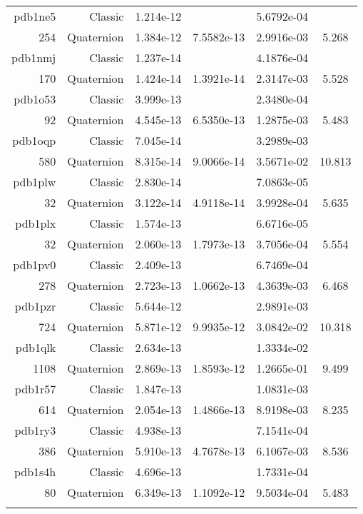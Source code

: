 \begin{xltabular}{\textwidth}{r|rS[table-format=1.3e+2]S[table-format=1.4e+2]S[table-format=1.4e+2]S[table-format=-1.3]}
pdb1ne5 & Classic & 1.214e-12 &  & 5.6792e-04 & \\
254 & Quaternion & 1.384e-12 & 7.5582e-13 & 2.9916e-03 & 5.268\\  \addlinespace
pdb1nmj & Classic & 1.237e-14 &  & 4.1876e-04 & \\
170 & Quaternion & 1.424e-14 & 1.3921e-14 & 2.3147e-03 & 5.528\\  \addlinespace
pdb1o53 & Classic & 3.999e-13 &  & 2.3480e-04 & \\
92 & Quaternion & 4.545e-13 & 6.5350e-13 & 1.2875e-03 & 5.483\\  \addlinespace
pdb1oqp & Classic & 7.045e-14 &  & 3.2989e-03 & \\
580 & Quaternion & 8.315e-14 & 9.0066e-14 & 3.5671e-02 & 10.813\\  \addlinespace
pdb1plw & Classic & 2.830e-14 &  & 7.0863e-05 & \\
32 & Quaternion & 3.122e-14 & 4.9118e-14 & 3.9928e-04 & 5.635\\  \addlinespace
pdb1plx & Classic & 1.574e-13 &  & 6.6716e-05 & \\
32 & Quaternion & 2.060e-13 & 1.7973e-13 & 3.7056e-04 & 5.554\\  \addlinespace
pdb1pv0 & Classic & 2.409e-13 &  & 6.7469e-04 & \\
278 & Quaternion & 2.723e-13 & 1.0662e-13 & 4.3639e-03 & 6.468\\  \addlinespace
pdb1pzr & Classic & 5.644e-12 &  & 2.9891e-03 & \\
724 & Quaternion & 5.871e-12 & 9.9935e-12 & 3.0842e-02 & 10.318\\  \addlinespace
pdb1qlk & Classic & 2.634e-13 &  & 1.3334e-02 & \\
1108 & Quaternion & 2.869e-13 & 1.8593e-12 & 1.2665e-01 & 9.499\\  \addlinespace
pdb1r57 & Classic & 1.847e-13 &  & 1.0831e-03 & \\
614 & Quaternion & 2.054e-13 & 1.4866e-13 & 8.9198e-03 & 8.235\\  \addlinespace
pdb1ry3 & Classic & 4.938e-13 &  & 7.1541e-04 & \\
386 & Quaternion & 5.910e-13 & 4.7678e-13 & 6.1067e-03 & 8.536\\  \addlinespace
pdb1s4h & Classic & 4.696e-13 &  & 1.7331e-04 & \\
80 & Quaternion & 6.349e-13 & 1.1092e-12 & 9.5034e-04 & 5.483\\  \addlinespace

\end{xltabular}
